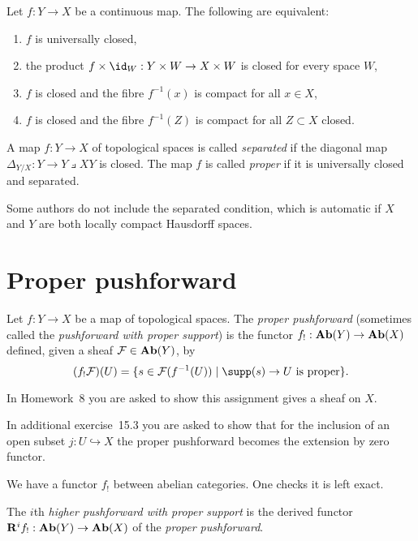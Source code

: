 \begin{prop}
	Let $f: Y \to X$ be a continuous map. The following are equivalent: 
	\begin{enumerate}
    	\item $f$ is universally closed,
		\item the product $f \times \id_W: Y \times W \to X \times W$ is closed for every space \(W\),
		\item $f$ is closed and the fibre $f^{-1}(x)$ is compact for all $x \in X$,
		\item $f$ is closed and the fibre $f^{-1}(Z)$ is compact for all $Z \subset X$ closed. 
    \end{enumerate}
\end{prop}

\begin{defn}
	A map $f: Y \to X$ of topological spaces is called \emph{separated} if the diagonal map $
    	\Delta_{Y/X}: Y \to Y\pullback{X} Y
    $ is closed. The map $f$ is called \emph{proper} if it is universally closed and separated. 
\end{defn}
\begin{rmk}
	Some authors do not include the separated condition, which is automatic if $X$ and $Y$ are both locally compact Hausdorff spaces.
\end{rmk}

\section{Proper pushforward}

\begin{defn}
	Let $f: Y \to X$ be a map of topological spaces. The \emph{proper pushforward} (sometimes called the \emph{pushforward with proper support}) is the functor $f_{!}: \operatorname{\mathbf{Ab}}(Y) \to \operatorname{\mathbf{Ab}}(X)$ defined, given a sheaf $\mathcal{F} \in \operatorname{\mathbf{Ab}}(Y)$, by \[
		(f_{!}\sh{F})(U) = \{s \in \sh{F}(f^{-1}(U)) \mid \supp(s) \to U \text{ is proper}\}.
    \]
\end{defn}
\begin{rmk}
	In Homework~8 you are asked to show this assignment gives a sheaf on $X$. 
\end{rmk}
\begin{exc}
	In additional exercise~15.3 you are asked to show that for the inclusion of an open subset $j: U \hookrightarrow X$ the proper pushforward becomes the extension by zero functor. 
\end{exc}
We have a functor $f_!$ between abelian categories. One checks it is left exact. 
\begin{defn}
	The $i$th \emph{higher pushforward with proper support} is the derived functor $\mathbf{R}^if_!: \operatorname{\mathbf{Ab}}(Y) \to \operatorname{\mathbf{Ab}}(X)$ of the \emph{proper pushforward}. 
\end{defn}

